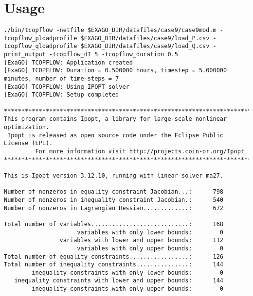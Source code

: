 \section{Usage}
\begin{lstlisting}
./bin/tcopflow -netfile $EXAGO_DIR/datafiles/case9/case9mod.m -tcopflow_ploadprofile $EXAGO_DIR/datafiles/case9/load_P.csv -tcopflow_qloadprofile $EXAGO_DIR/datafiles/case9/load_Q.csv -print_output -tcopflow_dT 5 -tcopflow_duration 0.5
[ExaGO] TCOPFLOW: Application created
[ExaGO] TCOPFLOW: Duration = 0.500000 hours, timestep = 5.000000 minutes, number of time-steps = 7
[ExaGO] TCOPFLOW: Using IPOPT solver
[ExaGO] TCOPFLOW: Setup completed

******************************************************************************
This program contains Ipopt, a library for large-scale nonlinear optimization.
 Ipopt is released as open source code under the Eclipse Public License (EPL).
         For more information visit http://projects.coin-or.org/Ipopt
******************************************************************************

This is Ipopt version 3.12.10, running with linear solver ma27.

Number of nonzeros in equality constraint Jacobian...:      798
Number of nonzeros in inequality constraint Jacobian.:      540
Number of nonzeros in Lagrangian Hessian.............:      672

Total number of variables............................:      168
                     variables with only lower bounds:        0
                variables with lower and upper bounds:      112
                     variables with only upper bounds:        0
Total number of equality constraints.................:      126
Total number of inequality constraints...............:      144
        inequality constraints with only lower bounds:        0
   inequality constraints with lower and upper bounds:      144
        inequality constraints with only upper bounds:        0


\end{lstlisting}
